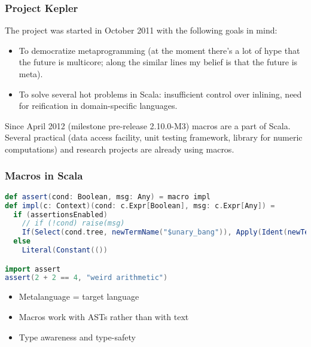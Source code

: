 \documentclass[hyperref={bookmarks=false}]{beamer}
\begin{document}
\begin{frame}[fragile]
\frametitle{Project Kepler}

The project was started in October 2011 with the following goals in mind:
\begin{itemize}
\item To democratize metaprogramming (at the moment there's a lot of hype that the future is multicore; along the similar lines my belief is that the future is meta).
\item To solve several hot problems in Scala: insufficient control over inlining, need for reification in domain-specific languages.
\end{itemize}

Since April 2012 (milestone pre-release 2.10.0-M3) macros are a part of Scala. Several practical (data access facility, unit testing framework, library for numeric computations) and research projects are already using macros.
\end{frame}

\begin{frame}[fragile]
\frametitle{Macros in Scala}
\begin{lstlisting}[language=scala]
def assert(cond: Boolean, msg: Any) = macro impl
def impl(c: Context)(cond: c.Expr[Boolean], msg: c.Expr[Any]) =
  if (assertionsEnabled)
    // if (!cond) raise(msg)
    If(Select(cond.tree, newTermName("$unary_bang")), Apply(Ident(newTermName("raise")), List(msg.tree)), Literal(Constant(())))
  else
    Literal(Constant(())

import assert
assert(2 + 2 == 4, "weird arithmetic")
\end{lstlisting}

\begin{itemize}
\item Metalanguage = target language
\item Macros work with ASTs rather than with text
\item Type awareness and type-safety
\end{itemize}
\end{frame}
\end{document}

